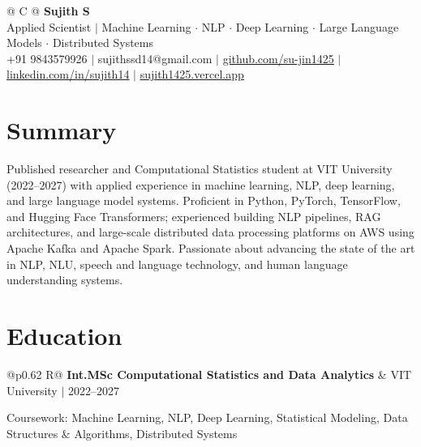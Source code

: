 \documentclass[a4paper,10pt]{article}
\newcommand{\ulink}[2]{\href{#1}{\uline{#2}}}
\newcommand{\subheading}[1]{{\color[HTML]{0A0A0A}\fontsize{12}{14}\selectfont\bfseries #1}}
\newcommand{\meta}[1]{{\color[HTML]{5C5C5C}\fontsize{10.5}{12.5}\selectfont #1}}
\begin{document}
\pagestyle{empty}

\begin{tabularx}{\linewidth}{@{} C @{}}
{\color[HTML]{000000}\fontsize{30}{35}\selectfont\bfseries Sujith S} \\[5pt]
{\fontsize{10.5}{12.5}\selectfont\color[HTML]{3A3A3A}
Applied Scientist $|$ Machine Learning $\cdot$ NLP $\cdot$ Deep Learning $\cdot$ Large Language Models $\cdot$ Distributed Systems} \\[6pt]
{\fontsize{10.5}{12.5}\selectfont\textcolor[HTML]{3A3A3A}{
+91 9843579926 $|$
sujithssd14@gmail.com $|$
\ulink{https://github.com/su-jin1425}{github.com/su-jin1425} $|$
\ulink{https://linkedin.com/in/sujith14}{linkedin.com/in/sujith14} $|$
\ulink{https://sujith1425.vercel.app}{sujith1425.vercel.app}}}
\end{tabularx}

\vspace{2pt}

\section{Summary}
\vspace{5pt}
{\color[HTML]{0A0A0A}\fontsize{11}{14}\selectfont
Published researcher and Computational Statistics student at VIT University (2022--2027) with applied experience in machine learning, NLP, deep learning, and large language model systems. Proficient in Python, PyTorch, TensorFlow, and Hugging Face Transformers; experienced building NLP pipelines, RAG architectures, and large-scale distributed data processing platforms on AWS using Apache Kafka and Apache Spark. Passionate about advancing the state of the art in NLP, NLU, speech and language technology, and human language understanding systems.}

\vspace{2pt}

\section{Education}
\vspace{2pt}

\begin{tabularx}{\linewidth}{@{}p{0.62\linewidth} R@{}}
\subheading{Int.MSc Computational Statistics and Data Analytics} & \meta{VIT University $|$ 2022--2027}
\end{tabularx}
\vspace{1pt}
{\color[HTML]{3A3A3A}\fontsize{11}{14}\selectfont Coursework: Machine Learning, NLP, Deep Learning, Statistical Modeling, Data Structures \& Algorithms, Distributed Systems}
\end{document}
